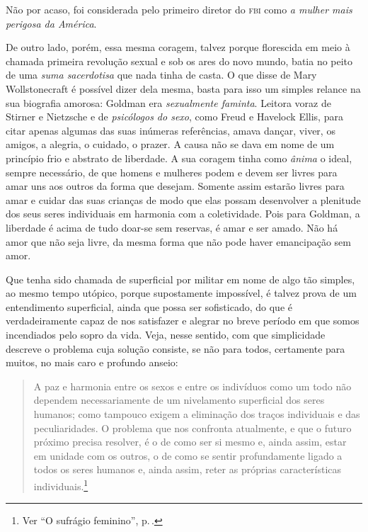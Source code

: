   Não por acaso, foi considerada pelo primeiro diretor do
\textsc{fbi} como \textit{a mulher mais perigosa da América}.

De outro lado, porém, essa mesma coragem, talvez porque florescida em
meio à chamada primeira revolução sexual e sob os ares do novo mundo,
batia no peito de uma \textit{suma sacerdotisa} que nada tinha de casta. O que
disse de Mary Wollstonecraft é possível dizer dela mesma, basta para
isso um simples relance na sua biografia amorosa: Goldman era
\textit{sexualmente faminta}. Leitora voraz de Stirner e Nietzsche e de
\textit{psicólogos do sexo}, como Freud e Havelock Ellis, para citar apenas
algumas das suas inúmeras referências, amava dançar, viver, os amigos, a
alegria, o cuidado, o prazer. A causa não se dava em nome de um
princípio frio e abstrato de liberdade. A sua coragem tinha como
\textit{ânima} o ideal, sempre necessário, de que homens e mulheres podem e
devem ser livres para amar uns aos outros da forma que desejam.
Somente assim estarão livres para amar e cuidar das suas
crianças de modo que elas possam desenvolver a plenitude dos seus seres
individuais em harmonia com a coletividade. Pois para Goldman, a
liberdade é acima de tudo doar-se sem reservas, é amar e ser amado. Não
há amor que não seja livre, da mesma forma que não pode haver
emancipação sem amor.

Que tenha sido chamada de superficial por militar
em nome de algo tão simples, ao mesmo tempo
utópico, porque supostamente impossível, é talvez prova de um
entendimento superficial, ainda que possa ser sofisticado, do que é
verdadeiramente capaz de nos satisfazer e alegrar no breve período em
que somos incendiados pelo sopro da vida. Veja, nesse sentido, com que
simplicidade descreve o problema cuja
solução consiste, se não para todos, certamente para muitos, no mais
caro e profundo anseio:

\begin{quote}
A paz e harmonia entre os sexos e entre os indivíduos como um todo não
dependem necessariamente de um nivelamento superficial dos seres
humanos; como tampouco exigem a eliminação dos traços individuais e das
peculiaridades. O problema que nos confronta atualmente, e que o futuro
próximo precisa resolver, é o de como ser si mesmo e, ainda assim, estar
em unidade com os outros, o de como se sentir profundamente ligado a
todos os seres humanos e, ainda assim, reter as próprias características
individuais.\footnote{Ver ``O sufrágio feminino'', p.\,\pageref{ref6}.}
\end{quote}

